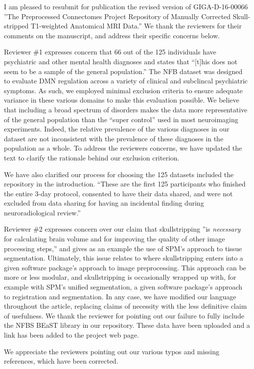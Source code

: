 \documentclass{article}
\begin{document}
\sffamily

I am pleased to resubmit for publication the revised version of GIGA-D-16-00066 ''The Preprocessed Connectomes Project Repository of Manually Corrected Skull-stripped T1-weighted Anatomical MRI Data.''  We thank the reviewers for their comments on the manuscript, and address their specific concerns below.

Reviewer \#1 expresses concern that 66 out of the 125 individuals have psychiatric and other mental health diagnoses and states that ``[t]his does not seem to be a sample of the general population.'' The NFB dataset was designed to evaluate DMN regulation across a variety of clinical and subclincal psychiatric symptoms. As such, we employed minimal exclusion criteria to ensure adequate variance in these various domains to make this evaluation possible. We believe that including a broad spectrum of disorders makes the data more representative of the general population than the ``super control'' used in most neuroimaging experiments. Indeed, the relative prevalence of the various diagnoses in our dataset are not inconsistent with the prevalence of these diagnoses in the population as a whole. To address the reviewers concerns, we have updated the text to clarify the rationale behind our exclusion criterion. 

We have also clarified our process for choosing the 125 datasets included the repository in the introduction. ``These are the first 125 participants who finished the entire 3-day protocol, consented to have their data shared, and were not excluded from data sharing for having an incidental finding during neuroradiological review.''

Reviewer \#2 expresses concern over our claim that skullstripping ''is {\em necessary} for calculating brain volume and for improving the quality of other image processing steps,'' and gives as an example the use of SPM's approach to tissue segmentation. Ultimately, this issue relates to where skullstripping enters into a given software package's approach to image preprocessing. This approach can be more or less modular, and skullstripping is occasionally wrapped up with, for example with SPM's unified segmentation, a given software package's approach to registration and segmentation. In any case, we have modified our language throughout the article, replacing claims of necessity with the less definitive claim of usefulness.
We thank the reviewer for pointing out our failure to fully include the NFBS BEaST library in our repository. These data have been uploaded and a link has been added to the project web page.

We appreciate the reviewers pointing out our various typos and missing references, which have been corrected.

\newpage
\end{document}
